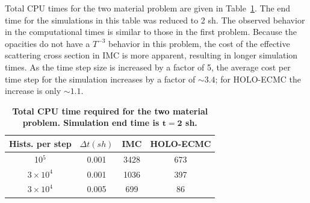 \documentclass{mc2013}
\begin{document}
Total CPU times for the two material problem are given in Table~\ref{twomat_table}. The end time for the simulations in this table was reduced to 2 sh.  The observed behavior in the computational times is similar to those
in the first problem.  Because the opacities do not have a $T^{-3}$ behavior in this problem, the cost of the effective scattering cross section in IMC is more apparent, resulting in longer simulation times.  As the time step size is increased by a factor of 5, the average cost per time step for the simulation increases by a factor of $\sim3.4$; for HOLO-ECMC the increase is only $\sim1.1$.   
\begin{table}[htb!]
\centering
\caption{\label{twomat_table} \textbf{Total CPU time required for the two material problem.  Simulation end time is $\mathbf{t=2}$ sh.}}
	\begin{tabular}{|c|c|c|c|} \hline
Hists. per step & $\Delta t (sh)$ & IMC & HOLO-ECMC \\ \hline
10$^5$                    &   0.001	& 3428  &	673 \\
$3\times10^4 $   &    0.001	& 1036  &	397  \\
$3\times10^4$     &   0.005	&  699  &       86     \\ \hline
\end{tabular}
\end{table}
\end{document}
